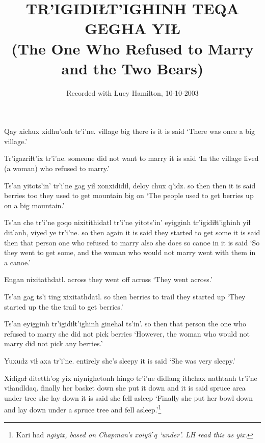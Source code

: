 \documentclass[12pt]{article}
\begin{document}
\title{TR'IGIDIŁT'IGHINH TEQA GEGHA YIŁ \\(The One Who Refused to
Marry and the Two Bears)}

\author{Recorded with Lucy Hamilton, 10-10-2003}
\date{}

\maketitle

\gll Qay  xichux xidhu'onh tr'i'ne.
village  big  {there is} {it is said}
\glt `There was once a big village.'
\glend

\gll Tr'igazriɬt'ix   tr'i'ne.
{someone did not want to marry} {it is said}
\glt `In the village lived (a woman) who refused to marry.'
\glend

\gll Ts'an yitots'in' tr'i'ne gag yiɬ xonxididiɬ,  deloy  chux q'idz.
{so then} then  {it is said} berries too {they used to get} mountain big on
\glt `The people used to get berries up on a big mountain.'
\glend

\gll Ts'an che tr'i'ne {goqo nixitithidatl}  tr'i'ne yitots'in' eyigginh tr'igidiɬt'ighinh yiɬ dit'anh, viyed ye tr'i'ne.
{so then} again {it is said} {they started to get some} {it is said} then {that person} {one who refused to marry} also {she does so} canoe in {it is said}
\glt `So they went to get some, and the woman who would not marry went with them in a canoe.'
\glend

\gll Engan nixitathdatl.
across  {they went off across}
\glt `They went across.'
\glend

\gll Ts'an gag  ts'i ting xixitathdatl.
{so then} berries  to trail {they started up}
\glt `They started up the the trail to get berries.'
\glend

\gll Ts'an eyigginh tr'igidiɬt'ighinh   {ginehal ts'in'.}
{so then} {that person} {the one who refused to marry} {she did not pick berries}
\glt `However, the woman who would not marry did not pick any berries.'
\glend

\gll Yuxudz {viɬ axa}  tr'i'ne.
entirely {she's sleepy}  {it is said}
\glt `She was very sleepy.'
\glend

\gll Xidigaɬ ditetth'og yix niynighetonh  hingo tr'i'ne  didlang ithchax nathtanh tr'i'ne viɬandldaq.
finally  {her basket} down  {she put it down}  and {it is said} spruce  {area under tree}  {she lay down} {it is said} {she fell asleep}
\glt `Finally she put her bowl down and lay down under a spruce tree and fell asleep.'\footnote{Kari had \em ngiyix, \em based on Chapman's \em xoiy\^uˊq \em `under'. LH read this as \em yix.}
\glend
\end{document}
